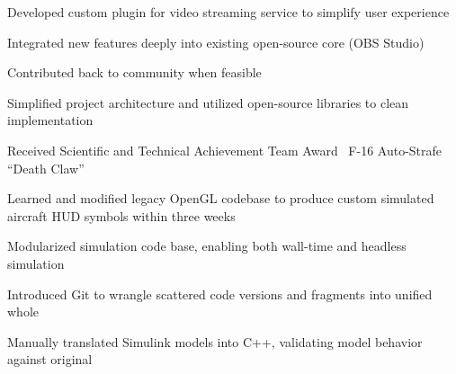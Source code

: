 \documentclass[letterpaper]{deedy-resume}
\newcommand{\experiencespace}{\vspace{2em}}
\begin{document}
\begin{minipage}[t]{0.66\textwidth}
	\begin{compactitem}
		\item Developed custom plugin for video streaming service to simplify user experience
        \item Integrated new features deeply into existing open-source core (OBS Studio)
        \item Contributed back to community when feasible
        \item Simplified project architecture and utilized open-source libraries to clean implementation
    \end{compactitem}
    \experiencespace

	\begin{compactitem}
		\item Received Scientific and Technical Achievement Team Award \textemdash\ F-16 Auto-Strafe ``Death
            Claw''
        \item Learned and modified legacy OpenGL codebase to produce custom simulated aircraft HUD symbols
            within three weeks
		\item Modularized simulation code base, enabling both wall-time and headless simulation
        \item Introduced Git to wrangle scattered code versions and fragments into unified whole
        \item Manually translated Simulink models into C++, validating model behavior against original
	\end{compactitem}
    \experiencespace


\end{minipage}
\end{document}
